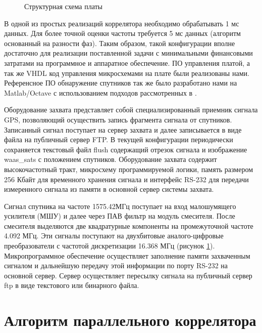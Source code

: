 \documentclass[a4paper,12pt]{article}
\numberwithin{table}{section}
\begin{document}
\begin{figure}[h]
\begin{center}
\end{center}
\caption{Структурная схема платы}
\label{pic:our-board}
\end{figure}

В одной из простых реализаций коррелятора необходимо обрабатывать 1 мс данных.
Для более точной оценки частоты требуется 5 мс данных (алгоритм основанный на разности фаз).
Таким образом, такой конфигурации вполне достаточно для реализации поставленной задачи с минимальными
финансовыми затратами на программное и аппаратное обеспечение.
ПО управления платой, а так же VHDL код управления микросхемами на плате были реализованы нами.
Референсное ПО обнаружение спутников так же было разработано нами на Matlab/Octave с использованием подходов рассмотренных в \cite{tsui}.

Оборудование захвата представляет собой специализированный приемник сигнала GPS, позволяющий осуществить запись фрагмента сигнала от спутников.
Записанный сигнал поступает на сервер захвата и далее записывается в виде файла на публичный сервер FTP.
В текущей конфигурации \cite{gpsproject} периодически сохраняется текстовый файл flush содержащий отрезок сигнала и изображение waas\_sats с
положением спутников. Оборудование захвата содержит высокочастотный тракт, микросхему программируемой логики, память размером 256 Кбайт
для временного хранения сигнала и интерфейс RS-232 для передачи измеренного сигнала из памяти в основной сервер системы захвата.

Сигнал спутника на частоте 1575.42МГц поступает на вход малошумящего усилителя (МШУ) и далее через ПАВ фильтр на модуль смесителя.
После смесителя выделяются две квадратурные компоненты на промежуточной частоте 4.092 МГц.
Эти сигналы поступают на двухбитовые аналого-цифровые преобразователи с частотой дискретизации 16.368 МГц (рисунок \ref{pic:our-board}).
Микропрограммное обеспечение осуществляет заполнение памяти захваченным сигналом и дальнейшую передачу этой информации
по порту RS-232 на основной сервер. Сервер осуществляет пересылку сигнала на публичный сервер ftp в виде текстового
или бинарного файла.

\section{Алгоритм параллельного коррелятора}
\end{document}
